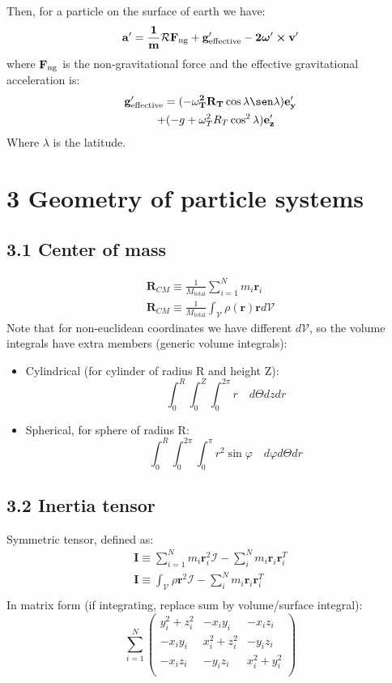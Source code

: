 \documentclass[a4paper,landscape,10pt]{cheatsheet}
\begin{document}
Then, for a particle on the surface of earth we have:
\begin{gather*}
  \bf{a}' = \frac{1}{m}\mathcal{R}\bf{F}_\text{ng} + \textbf{g}'_\text{effective} - 2\boldsymbol{\omega}'\cross \textbf{v}' \\
\end{gather*}
where $\bf{F}_\text{ng}$ is the non-gravitational force and the effective gravitational acceleration is:
\begin{gather*}
  \bf{g}'_\text{effective} = (-\omega^2_T R_T \cos\lambda\sen\lambda)\textbf{e}'_y \\
  \quad + (-g + \omega^2_T R_T \cos^2\lambda)\bf{e}'_z
\end{gather*}
Where $\lambda$ is the latitude.


\section*{3 Geometry of particle systems}
\subsection*{3.1 Center of mass}
\begin{gather*}
  \textbf{R}_{CM} \equiv \frac{1}{M_{\text{total}}}\sum_{i=1}^{N}m_i\textbf{r}_i \\
  \textbf{R}_{CM} \equiv \frac{1}{M_{\text{total}}}\int_{\mathcal{V}}\rho(\textbf{r})\textbf{r}d\mathcal{V}
\end{gather*}
Note that for non-euclidean coordinates we have different $d\mathcal{V}$, so the volume integrals have extra members
(generic volume integrals):
\begin{itemize}
  \item Cylindrical (for cylinder of radius R and height Z):
    $$
    \quad \int_{0}^{R}\int_{0}^{Z}\int_{0}^{2\pi}r \quad d\Theta dz dr
    $$
  \item Spherical, for sphere of radius R:
    $$
    \quad \int_{0}^{R}\int_{0}^{2\pi}\int_{0}^{\pi}r^2\sin{\varphi} \quad d\varphi d\Theta dr 
    $$
\end{itemize}

\subsection*{3.2 Inertia tensor}
Symmetric tensor, defined as:
\begin{gather*}
  \textbf{I} \equiv \sum_{i=1}^{N} m_i\textbf{r}_i^2\mathcal{I} - \sum_{i}^{N}m_i\textbf{r}_i\textbf{r}_i^T\\
  \textbf{I} \equiv \int_{\mathcal{V}} \rho\textbf{r}^2\mathcal{I} - \sum_{i}^{N}m_i\textbf{r}_i\textbf{r}_i^T\\
\end{gather*}
In matrix form (if integrating, replace sum by volume/surface integral):
$$
\sum_{i=1}^{N}
\begin{pmatrix*}
  y_i^2 + z_i^2 & -x_i y_i & -x_i z_i \\
  -x_i y_i & x_i^2 + z_i^2 & -y_i z_i \\
  -x_i z_i & -y_i z_i & x_i^2 + y_i^2 \\
\end{pmatrix*}
$$
\end{document}
